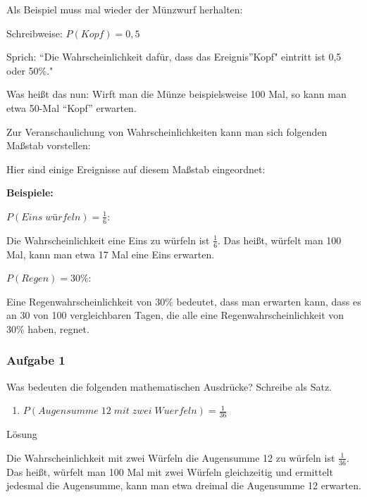 \documentclass[
  ngerman,
]{book}
\providecommand{\tightlist}{%
  \setlength{\itemsep}{0pt}\setlength{\parskip}{0pt}}
\begin{document}
Als Beispiel muss mal wieder der Münzwurf herhalten:

Schreibweise: \(P(Kopf)=0,5\quad\)

Sprich: ``Die Wahrscheinlichkeit dafür, dass das Ereignis''Kopf" eintritt ist 0,5 oder 50\%."

Was heißt das nun: Wirft man die Münze beispielsweise 100 Mal, so kann man etwa 50-Mal ``Kopf'' erwarten.

Zur Veranschaulichung von Wahrscheinlichkeiten kann man sich folgenden Maßstab vorstellen:

Hier sind einige Ereignisse auf diesem Maßstab eingeordnet:

\textbf{Beispiele:}

\(P(Eins\;würfeln)=\frac{1}{6}\):

Die Wahrscheinlichkeit eine Eins zu würfeln ist \(\frac{1}{6}\). Das heißt, würfelt man 100 Mal, kann man etwa 17 Mal eine Eins erwarten.

\(P(Regen)=30\%\):

Eine Regenwahrscheinlichkeit von 30\% bedeutet, dass man erwarten kann, dass es an 30 von 100 vergleichbaren Tagen, die alle eine Regenwahrscheinlichkeit von 30\% haben, regnet.

\hypertarget{section-65}{%
\subsubsection*{}\label{section-65}}

\hypertarget{aufgabe-1-8}{%
\subsubsection*{Aufgabe 1}\label{aufgabe-1-8}}

Was bedeuten die folgenden mathematischen Ausdrücke? Schreibe als Satz.

\begin{enumerate}
\def\labelenumi{\alph{enumi})}
\tightlist
\item
  \(P(Augensumme\;12\;mit\;zwei\;Wuerfeln)=\frac{1}{36}\)
\end{enumerate}

Lösung

Die Wahrscheinlichkeit mit zwei Würfeln die Augensumme 12 zu würfeln ist \(\frac{1}{36}\). Das heißt, würfelt man 100 Mal mit zwei Würfeln gleichzeitig und ermittelt jedesmal die Augensumme, kann man etwa dreimal die Augensumme 12 erwarten.
\end{document}
